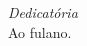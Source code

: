 \clearpage

\vspace*{0.75\textheight}

\begin{flushright}
\emph{Dedicatória} \\

  Ao fulano.
\end{flushright}
